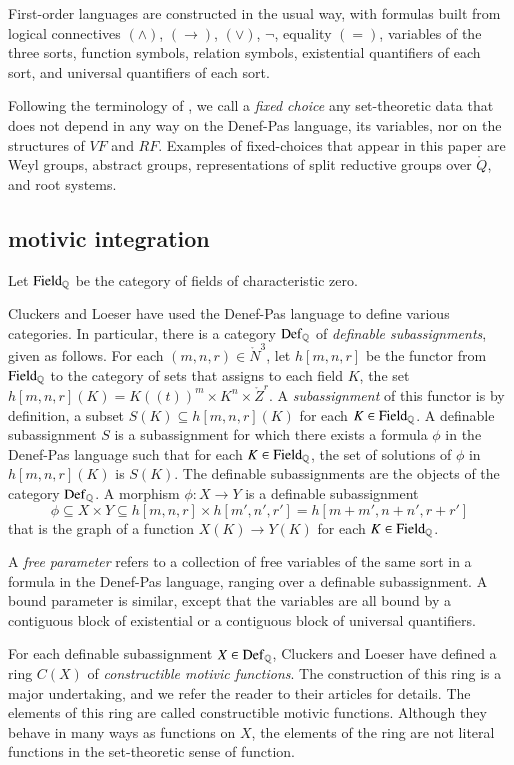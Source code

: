 First-order languages are constructed in the usual way, with formulas built from logical connectives $(\land)$, $(\to)$, $(\lor)$, $\neg$, equality
$(=)$, variables of the three sorts, function symbols, relation symbols, existential quantifiers of each sort, and universal quantifiers of each sort.


Following the terminology of \cite{gordon}, we call  a {\it fixed choice} any set-theoretic data that does not depend in any way on the Denef-Pas
language, its variables, nor on the structures of $VF$ and $RF$.   Examples of fixed-choices that appear in this paper are Weyl groups, abstract groups,
representations of split reductive groups over $\ring{Q}$, and root systems.

\subsection{motivic integration}


Let ${\operatorname{Field}}_{\mathbb{Q}}$ be the category of fields of characteristic zero.  

Cluckers and Loeser have used the Denef-Pas language to define various categories.  In particular, there
is a category  ${\operatorname{Def}}_{\mathbb{Q}}$ of {\it definable subassignments}, given as follows.
For each $(m,n,r)\in\ring{N}^3$, let $h[m,n,r]$ be the functor from ${\operatorname{Field}}_{\mathbb{Q}}$ to the category of sets that assigns
to each field $K$, the set $h[m,n,r](K)=K((t))^m\times K^n\times \ring{Z}^r$.  A {\it subassignment} of this functor is by
definition, a subset $S(K) \subseteq h[m,n,r](K)$ for each $K\in{\operatorname{Field}}_{\mathbb{Q}}$.  
A definable subassignment $S$ is  a subassignment for which there exists a formula $\phi$ in the Denef-Pas language such that for each $K\in{\operatorname{Field}}_{\mathbb{Q}}$, 
the set of solutions of $\phi$ in $h[m,n,r](K)$ is $S(K)$.
The definable subassignments are the objects of the category ${\operatorname{Def}}_{\mathbb{Q}}$.  
A morphism $\phi:X\to Y$ is a definable subassignment 
\[
\phi\subseteq X\times Y\subseteq h[m,n,r]\times h[m',n',r'] = h[m+m',n+n',r+r']
\]
that is the graph of a function $X(K)\to Y(K)$ for each $K\in {\operatorname{Field}}_{\mathbb{Q}}$.

A {\it free parameter} refers to a collection of free variables of the same sort in a formula in the Denef-Pas language, ranging over a definable
subassignment.  A bound parameter is similar, except that the variables are all bound by a contiguous block of existential or
a contiguous block of universal quantifiers.

For each definable subassignment $X\in {\operatorname{Def}}_{\mathbb{Q}}$, Cluckers and Loeser have defined a ring $C(X)$ of 
{\it constructible motivic functions}.  The construction of this ring is a major undertaking, and we refer the reader
to their articles for details.     The elements of this ring are called constructible motivic functions.  Although
they behave in many ways as functions on $X$,  the elements of the ring are not literal functions in the set-theoretic
sense of function.

